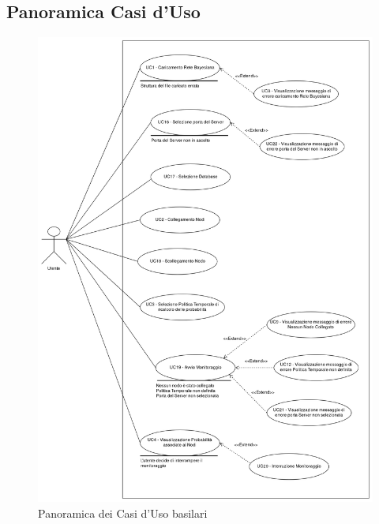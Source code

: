 
\subsection{Panoramica Casi d'Uso}\label{PanoramicaUC}
\begin{figure}[H]
	\begin{center}
		\includegraphics[scale=0.2]{./images/VistaUC.png}
		 \caption{Panoramica dei Casi d'Uso basilari}	
	\end{center}
\end{figure}

